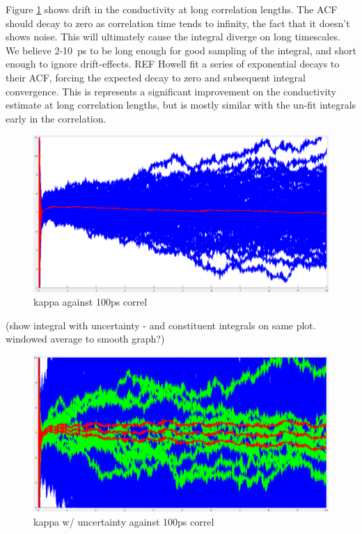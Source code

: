 \documentclass[%
preprint,                                  %
nofootinbib,
 amsmath,amssymb,
 aps,
]{revtex4-1}
\begin{document}
Figure \ref{fig:int_drift} shows drift in the conductivity at long correlation lengths. The ACF should decay to zero as correlation time tends to infinity, the fact that it doesn't shows noise. This will ultimately cause the integral diverge on long timescales. We believe 2-10~ps to be long enough for good sampling of the integral, and short enough to ignore drift-effects. REF Howell fit a series of exponential decays to their ACF, forcing the expected decay to zero and subsequent integral convergence. This is represents a significant improvement on the conductivity estimate at long correlation lengths, but is mostly similar with the un-fit integrals early in the correlation.   

\begin{figure}[h!]
  \includegraphics[width=\linewidth]{images/4x4x3_01-z-ints.png}
  \caption{kappa against 100ps correl}
  \label{fig:int_drift}
\end{figure}



(show integral with uncertainty - and constituent integrals on same plot. windowed average to smooth graph?)

\begin{figure}[h!]
  \includegraphics[width=\linewidth]{images/6x6x4_01-z-stddev.png}
  \caption{kappa w/ uncertainty against 100ps correl}
  \label{fig:664z_100ps}
\end{figure}
\end{document}
